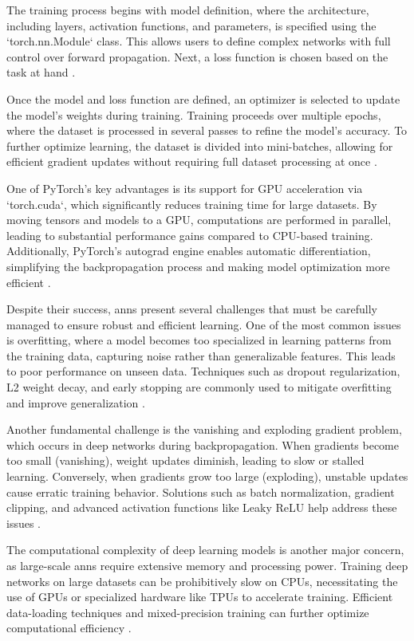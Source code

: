 The training process begins with model definition, where the architecture, including layers, activation functions, and parameters, is specified using the `torch.nn.Module` class.
This allows users to define complex networks with full control over forward propagation.
Next, a loss function is chosen based on the task at hand \cite{pytorchPyTorch}.

Once the model and loss function are defined, an optimizer is selected to update the model’s weights during training.
Training proceeds over multiple epochs, where the dataset is processed in several passes to refine the model’s accuracy.
To further optimize learning, the dataset is divided into mini-batches, allowing for efficient gradient updates without requiring full dataset processing at once \cite{pytorchPyTorch}.

One of PyTorch’s key advantages is its support for GPU acceleration via `torch.cuda`, which significantly reduces training time for large datasets.
By moving tensors and models to a GPU, computations are performed in parallel, leading to substantial performance gains compared to CPU-based training.
Additionally, PyTorch's autograd engine enables automatic differentiation, simplifying the backpropagation process and making model optimization more efficient \cite{pytorchPyTorch}.

Despite their success, \ac{ann}s present several challenges that must be carefully managed to ensure robust and efficient learning.
One of the most common issues is overfitting, where a model becomes too specialized in learning patterns from the training data, capturing noise rather than generalizable features.
This leads to poor performance on unseen data.
Techniques such as dropout regularization, L2 weight decay, and early stopping are commonly used to mitigate overfitting and improve generalization \cite{pytorchPyTorch,glorot2010understanding}.

Another fundamental challenge is the vanishing and exploding gradient problem, which occurs in deep networks during backpropagation.
When gradients become too small (vanishing), weight updates diminish, leading to slow or stalled learning.
Conversely, when gradients grow too large (exploding), unstable updates cause erratic training behavior.
Solutions such as batch normalization, gradient clipping, and advanced activation functions like Leaky ReLU help address these issues \cite{pytorchPyTorch,glorot2010understanding}.

The computational complexity of deep learning models is another major concern, as large-scale \ac{ann}s require extensive memory and processing power.
Training deep networks on large datasets can be prohibitively slow on CPUs, necessitating the use of GPUs or specialized hardware like TPUs to accelerate training.
Efficient data-loading techniques and mixed-precision training can further optimize computational efficiency \cite{pytorchPyTorch}.

